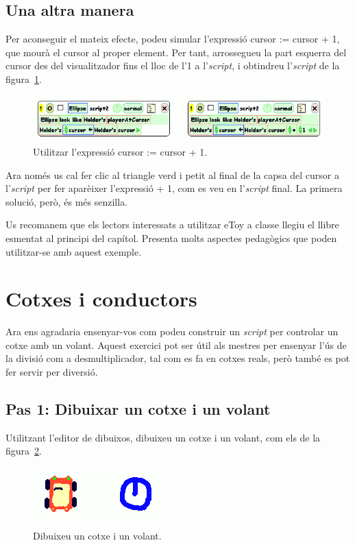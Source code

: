 \subsection{Una altra manera}
Per aconseguir el mateix efecte, podeu simular l'expressió \textsf{cursor := cursor + 1}, que mourà el cursor al proper element. Per tant, arrossegueu la part esquerra del cursor  des del visualitzador fins el lloc de l'1 a l'\emph{script}, i obtindreu l'\emph{script} de la figura~\ref{fig2431}.
\begin{figure}[h!]
\begin{center}
\includegraphics[scale=0.6]{Imatges/figura24-31}
\end{center}
\caption{Utilitzar l'expressió \textsf{\upshape cursor := cursor + 1}.}
\label{fig2431}
\end{figure}

Ara només us cal fer clic al triangle verd i petit al final de la capsa del cursor a l'\emph{script} per fer aparèixer l'expressió \textsf{+ 1}, com es veu en l'\emph{script} final. La primera solució, però, és més senzilla.

Us recomanem que els lectors interessats a utilitzar eToy a classe llegiu el llibre esmentat al principi del capítol. Presenta molts aspectes pedagògics que poden utilitzar-se amb aquest exemple.

\section{Cotxes i conductors}
Ara ens agradaria ensenyar-vos com podeu construir un \emph{script} per controlar un cotxe amb un volant. Aquest exercici pot ser útil als mestres per ensenyar l'ús de la divisió com a desmultiplicador, tal com es fa en cotxes reals, però també es pot fer servir per diversió.

\subsection{Pas 1: Dibuixar un cotxe i un volant}
Utilitzant l'editor de dibuixos, dibuixeu un cotxe i un volant, com els de la figura~\ref{fig2432}.
\begin{figure}[h!]
\begin{center}
\includegraphics[scale=0.75]{Imatges/figura24-32}
\end{center}
\caption{Dibuixeu un cotxe i un volant.}
\label{fig2432}
\end{figure}

